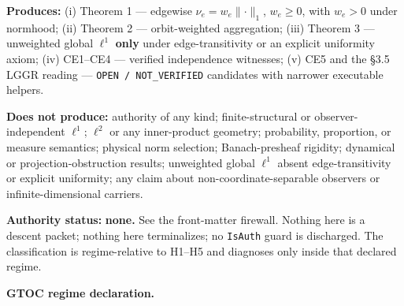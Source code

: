 \documentclass[
  11pt,
]{article}
\begin{document}
\textbf{Produces:} (i) Theorem 1 --- edgewise
\(\nu_e=w_e\lVert\cdot\rVert_1\), \(w_e\ge0\), with \(w_e>0\) under
normhood; (ii) Theorem 2 --- orbit-weighted aggregation; (iii) Theorem 3
--- unweighted global \(\ell^1\) \textbf{only} under edge-transitivity
or an explicit uniformity axiom; (iv) CE1--CE4 --- verified independence
witnesses; (v) CE5 and the §3.5 LGGR reading ---
\texttt{OPEN /\allowbreak{} NOT\_\allowbreak{}VERIFIED} candidates with
narrower executable helpers.

\textbf{Does not produce:} authority of any kind; finite-structural or
observer-independent \(\ell^1\); \(\ell^2\) or any inner-product
geometry; probability, proportion, or measure semantics; physical norm
selection; Banach-presheaf rigidity; dynamical or projection-obstruction
results; unweighted global \(\ell^1\) absent edge-transitivity or
explicit uniformity; any claim about non-coordinate-separable observers
or infinite-dimensional carriers.

\textbf{Authority status:} \textbf{none.} See the front-matter firewall.
Nothing here is a descent packet; nothing here terminalizes; no
\texttt{IsAuth} guard is discharged. The classification is
regime-relative to H1--H5 and diagnoses only inside that declared
regime.

\textbf{GTOC regime declaration.}
\end{document}
